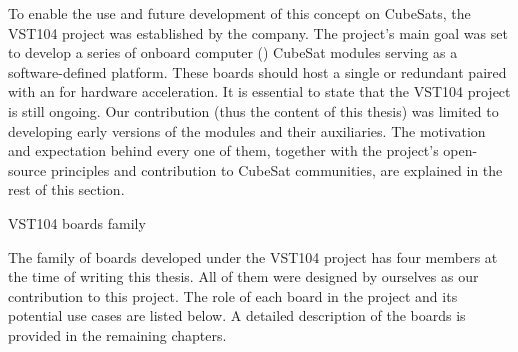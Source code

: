 To enable the use and future development of this concept on CubeSats, the VST104 project was established by the company. The project's main goal was set to develop a series of onboard computer () CubeSat modules serving as a software-defined platform. These boards should host a single or redundant  paired with an  for hardware acceleration. It is essential to state that the VST104 project is still ongoing. Our contribution (thus the content of this thesis) was limited to developing early versions of the  modules and their auxiliaries. The motivation and expectation behind every one of them, together with the project's open-source principles and contribution to CubeSat communities, are explained in the rest of this section.




\secc VST104 boards family

\quad The family of boards developed under the VST104 project has four members at the time of writing this thesis. All of them were designed by ourselves as our contribution to this project. The role of each board in the project and its potential use cases are listed below. A detailed description of the boards is provided in the remaining chapters.

